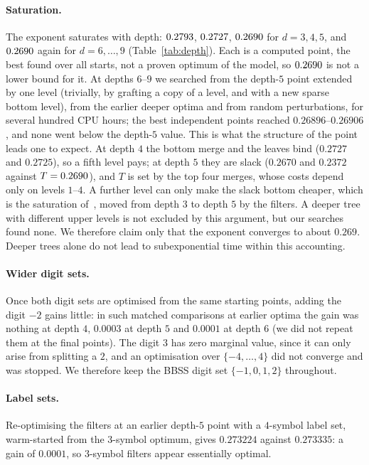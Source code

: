 \documentclass[11pt]{article}
\theoremstyle{definition}
\theoremstyle{remark}
\begin{document}
\paragraph{Saturation.} The exponent saturates with depth: $0.2793$, $0.2727$, $0.2690$ for
$d=3,4,5$, and $0.2690$ again for $d=6,\dots,9$ (Table~\ref{tab:depth}). Each is a computed point, the best found
over all starts, not a proven optimum of the model, so $0.2690$ is not a lower bound for it. At depths $6$--$9$ we
searched from the depth-$5$ point extended by one level (trivially, by grafting a copy of a level, and with a new
sparse bottom level), from the earlier deeper optima and from random perturbations, for several hundred CPU hours;
the best independent points reached $0.26896$--$0.26906$, and none went below the depth-$5$ value. This is what the
structure of the point leads one to expect. At depth $4$ the bottom merge and the leaves bind ($0.2727$ and $0.2725$),
so a fifth level pays; at depth $5$ they are slack ($0.2670$ and $0.2372$ against $T=0.2690$), and $T$ is set by
the top four merges, whose costs depend only on levels $1$--$4$. A further level can only make the slack bottom
cheaper, which is the saturation of~\cite[Remark~4]{BBSS20}, moved from depth $3$ to depth $5$ by the filters. A
deeper tree with different upper levels is not excluded by this argument, but our searches found none. We therefore claim
only that the exponent converges to about $0.269$. Deeper trees alone do not lead to subexponential time within this
accounting.

\paragraph{Wider digit sets.} Once both digit sets are optimised from the same starting points, adding the digit
$-2$ gains little: in such matched comparisons at earlier optima the gain was nothing at depth $4$, $0.0003$ at depth
$5$ and $0.0001$ at depth $6$ (we did not repeat them at the final points). The digit $3$ has zero marginal value, since it can only arise from
splitting a $2$, and an optimisation over $\{-4,\dots,4\}$ did not converge and was stopped. We therefore keep the BBSS
digit set $\{-1,0,1,2\}$ throughout.

\paragraph{Label sets.} Re-optimising the filters at an earlier depth-$5$ point with a $4$-symbol label set,
warm-started from the $3$-symbol optimum, gives $0.273224$ against $0.273335$: a gain of $0.0001$, so $3$-symbol filters appear essentially
optimal.
\end{document}
